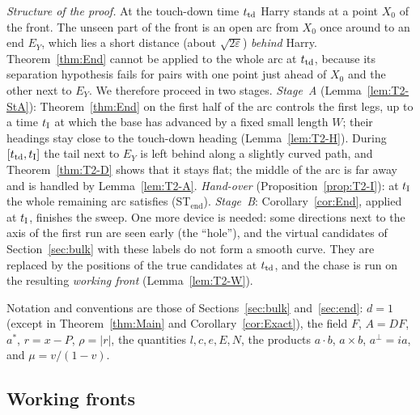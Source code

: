 \emph{Structure of the proof.} At the touch-down time $t_{\mathrm{td}}$ Harry stands at a point $X_0$ of the front. The unseen part of the
front is an open arc from $X_0$ once around to an end $E_Y$, which lies a short distance (about $\sqrt{2\varepsilon}$) \emph{behind}
Harry. Theorem~\ref{thm:End} cannot be applied to the whole arc at $t_{\mathrm{td}}$, because its separation hypothesis fails for pairs with
one point just ahead of $X_0$ and the other next to $E_Y$. We therefore proceed in two stages. \emph{Stage~A}
(Lemma~\ref{lem:T2-StA}): Theorem~\ref{thm:End} on the first half of the arc controls the first legs, up to a time $t_{\mathrm I}$ at which
the base has advanced by a fixed small length $W$; their headings stay close to the touch-down heading
(Lemma~\ref{lem:T2-H}). During $[t_{\mathrm{td}},t_{\mathrm I}]$ the tail next to $E_Y$ is left behind along a slightly curved path, and
Theorem~\ref{thm:T2-D} shows that it stays flat; the middle of the arc is far away and is handled by Lemma~\ref{lem:T2-A}.
\emph{Hand-over} (Proposition~\ref{prop:T2-I}): at $t_{\mathrm I}$ the whole remaining arc satisfies \textup{(ST$_{\mathrm{end}}$)}.
\emph{Stage~B}: Corollary~\ref{cor:End}, applied at $t_{\mathrm I}$, finishes the sweep. One more device is needed: some directions next
to the axis of the first run are seen early (the ``hole''), and the virtual candidates of Section~\ref{sec:bulk} with these labels
do not form a smooth curve. They are replaced by the positions of the true candidates at $t_{\mathrm{td}}$, and the chase is run on the
resulting \emph{working front} (Lemma~\ref{lem:T2-W}).

Notation and conventions are those of Sections~\ref{sec:bulk} and~\ref{sec:end}: $d=1$ (except in Theorem~\ref{thm:Main} and
Corollary~\ref{cor:Exact}), the field $F$, $A=DF$, $a^*$, $r=x-P$, $\rho=|r|$, the quantities $l,c,e,E,N$, the products
$a\cdot b$, $a\times b$, $a^\perp=ia$, and $\mu=v/(1-v)$.

\subsection{Working fronts}

